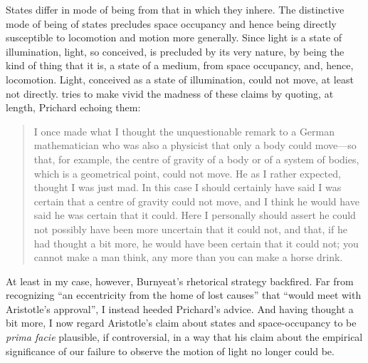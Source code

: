States differ in mode of being from that in which they inhere. The distinctive mode of being of states precludes space occupancy and hence being directly susceptible to locomotion and motion more generally. Since light is a state of illumination, light, so conceived, is precluded by its very nature, by being the kind of thing that it is, a state of a medium, from space occupancy, and, hence, locomotion. Light, conceived as a state of illumination, could not move, at least not directly. \citet[430 n29; appendix]{Burnyeat:1995fk} tries to make vivid the madness of these claims by quoting, at length, Prichard echoing them:
\begin{quote}
	I once made what I thought the unquestionable remark to a German mathematician who was also a physicist that only a body could move---so that, for example, the centre of gravity of a body or of a system of bodies, which is a geometrical point, could not move. He as I rather expected, thought I was just mad. In this case I should certainly have said I was certain that a centre of gravity could not move, and I think he would have said he was certain that it could. Here I personally should assert he could not possibly have been more uncertain that it could not, and that, if he had thought a bit more, he would have been certain that it could not; you cannot make a man think, any more than you can make a horse drink. \citep[99; this is just the initial paragraph of the material that Burnyeat quotes]{Prichard:1950tg}
\end{quote}
At least in my case, however, Burnyeat's \citeyearpar[430 n29]{Burnyeat:1995fk} rhetorical strategy backfired. Far from recognizing ``an eccentricity from the home of lost causes'' that ``would meet with Aristotle's approval'', I instead heeded Prichard's advice. And having thought a bit more, I now regard Aristotle's claim about states and space-occupancy to be \emph{prima facie} plausible, if controversial, in a way that his claim about the empirical significance of our failure to observe the motion of light no longer could be.

